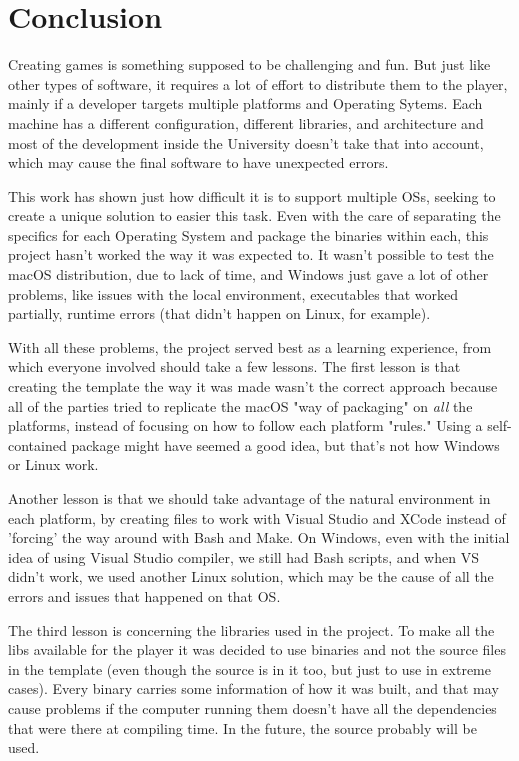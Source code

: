 \chapter{Conclusion}
\label{sec:conclusion}

Creating games is something supposed to be challenging and fun. But just like other types of software, it requires a lot of effort to distribute them to the player, mainly if a developer targets multiple platforms and Operating Sytems. Each machine has a different configuration, different libraries, and architecture and most of the development inside the University doesn't take that into account, which may cause the final software to have unexpected errors.

This work has shown just how difficult it is to support multiple OSs, seeking to create a unique solution to easier this task. Even with the care of separating the specifics for each Operating System and package the binaries within each, this project hasn't worked the way it was expected to. It wasn't possible to test the macOS distribution, due to lack of time, and Windows just gave a lot of other problems, like issues with the local environment, executables that worked partially, runtime errors (that didn't happen on Linux, for example).

With all these problems, the project served best as a learning experience, from which everyone involved should take a few lessons. The first lesson is that creating the template the way it was made wasn't the correct approach because all of the parties tried to replicate the macOS "way of packaging" on \textit{all} the platforms, instead of focusing on how to follow each platform "rules." Using a self-contained package might have seemed a good idea, but that's not how Windows or Linux work.

Another lesson is that we should take advantage of the natural environment in each platform, by creating files to work with Visual Studio and XCode instead of 'forcing' the way around with Bash and Make. On Windows, even with the initial idea of using Visual Studio compiler, we still had Bash scripts, and when VS didn't work, we used another Linux solution, which may be the cause of all the errors and issues that happened on that OS.

The third lesson is concerning the libraries used in the project. To make all the libs available for the player it was decided to use binaries and not the source files in the template (even though the source is in it too, but just to use in extreme cases). Every binary carries some information of how it was built, and that may cause problems if the computer running them doesn't have all the dependencies that were there at compiling time. In the future, the source probably will be used.

